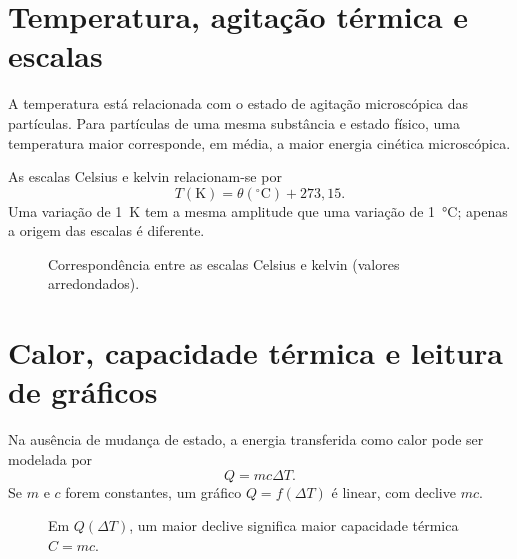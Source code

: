 \documentclass[11pt,a4paper,oneside]{book}
\begin{document}
\section{Temperatura, agitação térmica e escalas}
A temperatura está relacionada com o estado de agitação microscópica das partículas. Para partículas de uma mesma substância e estado físico, uma temperatura maior corresponde, em média, a maior energia cinética microscópica.

As escalas Celsius e kelvin relacionam-se por
\[
T(\mathrm K)=\theta(^{\circ}\mathrm C)+273{,}15.
\]
Uma variação de \SI{1}{K} tem a mesma amplitude que uma variação de \SI{1}{\celsius}; apenas a origem das escalas é diferente.

\begin{figure}[H]
\centering
{}
\caption{Correspondência entre as escalas Celsius e kelvin (valores arredondados).}
\end{figure}

\section{Calor, capacidade térmica e leitura de gráficos}
Na ausência de mudança de estado, a energia transferida como calor pode ser modelada por
\[
Q=mc\Delta T.
\]
Se $m$ e $c$ forem constantes, um gráfico $Q=f(\Delta T)$ é linear, com declive $mc$.

\begin{figure}[H]
\centering
{}
\caption{Em $Q(\Delta T)$, um maior declive significa maior capacidade térmica $C=mc$.}
\end{figure}
\end{document}
